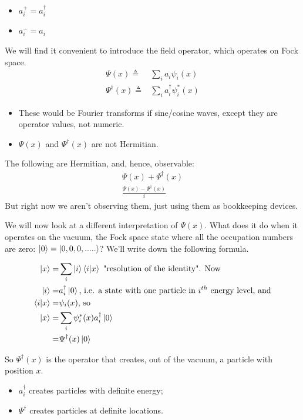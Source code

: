 \documentclass[]{article}
\begin{document}
\begin{itemize}
	\item $a^+_i=a^\dagger_i$
	\item $a^-_i=a_i$
\end{itemize} 

We will find it convenient to introduce the field operator, which operates on Fock space.
\begin{align*}
	\Psi(x) \triangleq & \sum_{i} a_i \psi_i(x)\\
	\Psi^\dagger(x) \triangleq& \sum_{i} a^\dagger_i \psi^*_i(x)
\end{align*}

\begin{itemize}
	\item These would be Fourier transforms if sine/cosine waves, except they are operator values, not numeric.
	\item $\Psi(x)$ and $\Psi^\dagger(x)$ are not Hermitian.
\end{itemize}

The following are Hermitian, and, hence, observable:
\begin{align*}
	\Psi(x) + \Psi^\dagger(x) \\
	\frac{\Psi(x) - \Psi^\dagger(x)}{i}
\end{align*}
But right now we aren't observing them, just using them as bookkeeping devices.

We will now look at a different interpretation of $\Psi(x)$. What does it do when it operates on the vacuum, the Fock space state where all the occupation numbers are zero: $\ket{0} = \ket{0,0,0,.....}$? We'll write down the following formula.

\begin{align*}
	\ket{x}=&\sum_{i}\ket{i}\braket{i|x}\text{ "resolution of the identity". Now}\\
	\ket{i}=&a^\dagger_i\ket{0} \text{, i.e. a state with one particle in $i^{th}$ energy level, and}\\
	\braket{i|x}=&\psi_i(x) \text{, so}\\
	\ket{x}=& \sum_i \psi^*_i(x)a^\dagger_i\ket{0}\\
	=& \Psi^\dagger(x) \ket{0}
\end{align*} 

So $\Psi^\dagger(x)$ is the operator that creates, out of the vacuum, a particle with position $x$.

\begin{itemize}
	\item $a^\dagger_i$ creates particles with definite energy;
	\item $\Psi^\dagger$ creates particles at definite locations.
\end{itemize}
\end{document}
